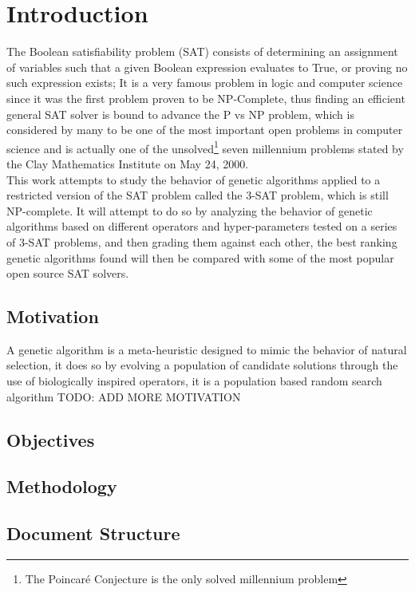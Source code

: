 \section{Introduction}

The Boolean satisfiability problem (SAT) consists of determining an assignment of variables such that a given Boolean expression evaluates to True, or proving no such expression exists; It is a very famous problem in logic and computer science since it was the first problem proven to be NP-Complete, thus finding an efficient general SAT solver is bound to advance the P vs NP problem, which is considered by many to be one of the most important open problems in computer science and is actually one of the unsolved\footnote{The Poincaré Conjecture is the only solved millennium problem} seven millennium problems stated by the Clay Mathematics Institute on May 24, 2000. 
\\This work attempts to study the behavior of genetic algorithms applied to a restricted version of the SAT problem called the 3-SAT problem, which is still NP-complete. It will attempt to do so by analyzing the behavior of genetic algorithms based on different operators and hyper-parameters tested on a series of 3-SAT problems, and then grading them against each other, the best ranking genetic algorithms found will then be compared with some of the most popular open source SAT solvers.

\subsection {Motivation}

A genetic algorithm is a meta-heuristic designed to mimic the behavior of natural selection, it does so by evolving a population of candidate solutions through the use of biologically inspired operators, it is a population based random search algorithm \parencite{Cochran2011}
TODO: ADD MORE MOTIVATION

\subsection {Objectives}


\subsection {Methodology}


\subsection {Document Structure}

